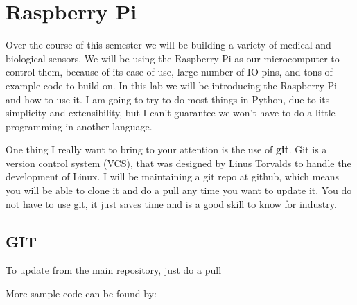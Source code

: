 \chapter{Raspberry Pi}

Over the course of this semester we will be building a variety of medical and biological sensors.  We will be using the Raspberry Pi as our microcomputer to control them, because of its ease of use, large number of IO pins, and tons of example code to build on.  In this lab we will be introducing the Raspberry Pi and how to use it.  I am going to try to do most things in Python, due to its simplicity and extensibility, but I can't guarantee we won't have to do a little programming in another language.

One thing I really want to bring to your attention is the use of \textbf{git}.  Git is a version control system (VCS), that was designed by Linus Torvalds to handle the development of Linux.  I will be maintaining a git repo at github, which means you will be able to clone it and do a pull any time you want to update it.  You do not have to use git, it just saves time and is a good skill to know for industry.

\section{GIT}






To update from the main repository, just do a pull


More sample code can be found by:





